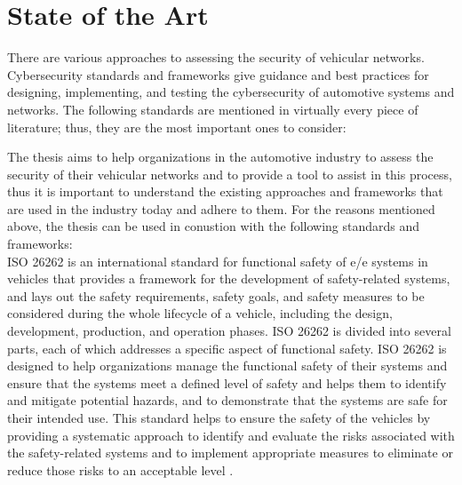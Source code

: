 \chapter{State of the Art}
\label{chp:stateoftheart}

There are various approaches to assessing the security of vehicular networks. Cybersecurity standards and frameworks give guidance and best practices for designing, implementing, and testing the cybersecurity of automotive systems and networks.
The following standards are mentioned in virtually every piece of literature; thus, they are the most important ones to consider:

The thesis aims to help organizations in the automotive industry to assess the security of their vehicular networks and to provide a tool to assist in this process, thus it is important to understand the existing approaches and frameworks that are used in the industry today and adhere to them.
For the reasons mentioned above, the thesis can be used in conustion with the following standards and frameworks:\\

ISO 26262 is an international standard for functional safety of \gls{e/e} systems in vehicles that provides a framework for the development of safety-related systems, 
and lays out the safety requirements, safety goals, and safety measures to be considered during the whole lifecycle of a vehicle, including the design, development, production, and operation phases.
ISO 26262 is divided into several parts, each of which addresses a specific aspect of functional safety.
ISO 26262 is designed to help organizations manage the functional safety of their systems and ensure that the systems meet a defined level of safety and helps them to identify and mitigate potential hazards, and to demonstrate that the systems are safe for their intended use. 
This standard helps to ensure the safety of the vehicles by providing a systematic approach to identify and evaluate the risks associated with the safety-related systems and to implement appropriate measures to eliminate or reduce those risks to an acceptable level \cite{iso26262}.

